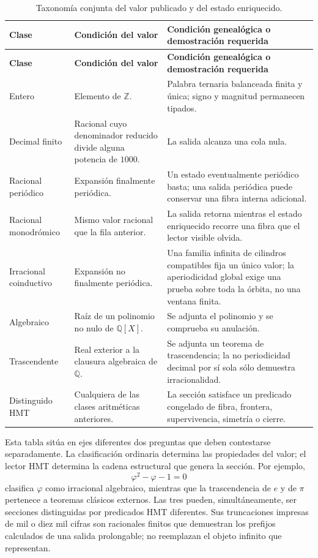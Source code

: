 \begin{longtable}{@{}>{\raggedright\arraybackslash}p{}
                    >{\raggedright\arraybackslash}p{}
                    >{\raggedright\arraybackslash}p{}@{}}
\caption{Taxonom\'ia conjunta del valor publicado y del estado enriquecido.}
\label{p3-83-c44-s1:tab:taxonomia-conjunta-numeros-rev11}\\
\toprule
\textbf{Clase} & \textbf{Condici\'on del valor} &
\textbf{Condici\'on geneal\'ogica o demostraci\'on requerida}\\
\midrule
\endfirsthead
\toprule
\textbf{Clase} & \textbf{Condici\'on del valor} &
\textbf{Condici\'on geneal\'ogica o demostraci\'on requerida}\\
\midrule
\endhead
Entero & Elemento de \(\mathbb Z\). & Palabra ternaria balanceada finita y
\'unica; signo y magnitud permanecen tipados.\\
Decimal finito & Racional cuyo denominador reducido divide alguna potencia
de \(1000\). & La salida alcanza una cola nula.\\
Racional peri\'odico & Expansi\'on finalmente peri\'odica. & Un estado
eventualmente peri\'odico basta; una salida peri\'odica puede conservar una
fibra interna adicional.\\
Racional monodr\'omico & Mismo valor racional que la fila anterior. & La
salida retorna mientras el estado enriquecido recorre una fibra que el lector
visible olvida.\\
Irracional coinductivo & Expansi\'on no finalmente peri\'odica. & Una familia
infinita de cilindros compatibles fija un único valor; la aperiodicidad
global exige una prueba sobre toda la órbita, no una ventana finita.\\
Algebraico & Ra\'iz de un polinomio no nulo de \(\mathbb Q[X]\). & Se adjunta
el polinomio y se comprueba su anulaci\'on.\\
Trascendente & Real exterior a la clausura algebraica de \(\mathbb Q\). & Se
adjunta un teorema de trascendencia; la no periodicidad decimal por s\'i sola
s\'olo demuestra irracionalidad.\\
Distinguido HMT & Cualquiera de las clases aritm\'eticas anteriores. & La
secci\'on satisface un predicado congelado de fibra, frontera, supervivencia,
simetr\'ia o cierre.\\
\bottomrule
\end{longtable}

Esta tabla sit\'ua en ejes diferentes dos preguntas que deben contestarse
separadamente. La clasificaci\'on ordinaria determina las propiedades del valor;
el lector HMT determina la cadena estructural que genera la secci\'on. Por
ejemplo,
\[
 \varphi^2-\varphi-1=0
\]
clasifica \(\varphi\) como irracional algebraico, mientras que la
trascendencia de \(e\) y de \(\pi\) pertenece a teoremas cl\'asicos externos.
Las tres pueden, simult\'aneamente, ser secciones distinguidas por predicados
HMT diferentes. Sus truncaciones impresas de mil o diez mil cifras son
racionales finitos que demuestran los prefijos calculados de una salida prolongable; no
reemplazan el objeto infinito que representan.

